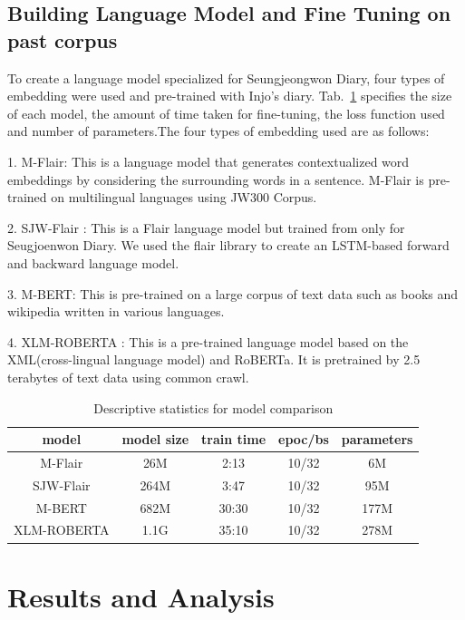 \documentclass[sigconf]{acmart}
\begin{document}
\subsection{Building Language Model and Fine Tuning on past corpus}

To create a language model specialized for Seungjeongwon Diary, four types of embedding were used and pre-trained with Injo's diary. Tab.~\ref{tab2} specifies the size of each model, the amount of time taken for fine-tuning, the loss function used and number of parameters.The four types of embedding used are as follows:

1.	M-Flair: This is a language model that generates contextualized word embeddings by considering the surrounding words in a sentence\cite{ref_articles8}. M-Flair is pre-trained on multilingual languages using JW300 Corpus\cite{ref_proc3}.

2.	SJW-Flair : This is a Flair language model but trained from only for Seugjoenwon Diary. We used the flair library to create an LSTM-based forward and backward language model.

3.	M-BERT: This is pre-trained on a large corpus of text data such as books and wikipedia written in various languages\cite{ref_article2}.

4.	XLM-ROBERTA : This is a pre-trained language model based on the XML(cross-lingual language model) and RoBERTa\cite{ref_article_liu}\cite{ref_article6}. It is pretrained by 2.5 terabytes of text data using common crawl. 


\begin{table}
	\caption{Descriptive statistics for model comparison}\label{tab2}
	\begin{tabular}{ccccc}
		\toprule
		model & model size & train time & epoc/bs &  parameters\\
		\midrule
		M-Flair 	&	26M	&	2:13	&	10/32		&		6M		\\
		SJW-Flair 	& 264M 	&   3:47 	& 	10/32	 	& 	 	95M		\\
		M-BERT 		& 682M 	&	30:30	&	10/32	 	& 	 	177M	\\
		XLM-ROBERTA	&	1.1G&	35:10	&	10/32	 	& 	 	278M	\\
		
		\bottomrule
	\end{tabular}
\end{table}



\section{Results and Analysis}
\end{document}
